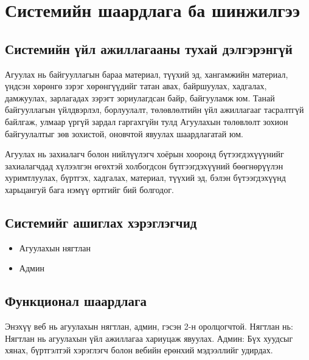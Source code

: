
\chapter{Системийн шаардлага ба шинжилгээ} %
\label{Chapter2} %

\section{Системийн үйл ажиллагааны тухай дэлгэрэнгүй }
\qquad Агуулах нь байгууллагын бараа материал, түүхий эд, хангамжийн материал, үндсэн хөрөнгө зэрэг хөрөнгүүдийг татан авах, байршуулах, хадгалах, дамжуулах, зарлагадах зэрэгт зориулагдсан байр, байгууламж юм. Танай байгууллагын үйлдвэрлэл, борлуулалт, төлөвлөлтийн үйл ажиллагааг тасралтгүй байлгаж, улмаар үргүй зардал гаргахгүйн тулд Агуулахын төлөвлөлт зохион байгуулалтыг зөв зохистой, оновчтой явуулах шаардлагатай юм.

Агуулах нь захиалагч болон нийлүүлэгч хоёрын хооронд бүтээгдэхүүүнийг захиалагчдад хүлээлгэн өгөхтэй холбогдсон бүтгээгдэхүүний бөөгнөрүүлэн хуримтлуулах, бүртгэх, хадгалах, материал, түүхий эд, бэлэн бүтээгдэхүүнд харьцангуй бага нэмүү өртгийг бий болгодог. 

\section{Системийг ашиглах хэрэглэгчид}
\begin{itemize}
\item Агуулахын нягтлан
\item Админ

\end{itemize}
\section{Функционал шаардлага}

\qquad Энэхүү веб нь агуулахын нягтлан, админ, гэсэн 2-н оролцогчтой.
Нягтлан нь: Нягтлан нь агуулахын үйл ажиллагаа хариуцаж явуулах.
Админ: Бүх хуудсыг хянах, бүртгэлтэй хэрэглэгч болон вебийн ерөнхий мэдээллийг удирдах.


